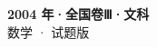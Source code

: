 \documentclass[zihao=-4, a4paper]{ctexart}
\begin{document}
\begin{center}
  {\Large\bfseries 2004 年·全国卷Ⅲ·文科}\\[4pt]
  {\large 数学 · 试题版}
\end{center}
\medskip
{}

\end{document}
